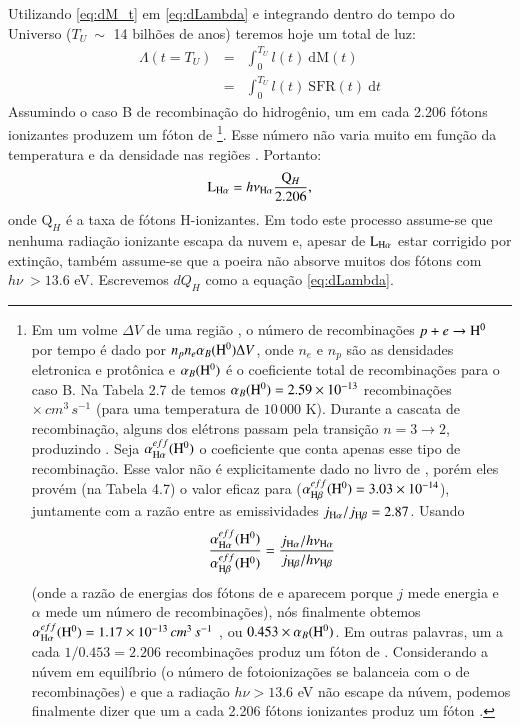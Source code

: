 Utilizando \eqref{eq:dM_t} em \eqref{eq:dLambda} e integrando dentro do tempo do Universo ($T_U\ \sim$ 14 bilhões de anos) teremos hoje um total de luz:
\begin{eqnarray}
	\Lambda(t = T_U) &=& \int_0^{T_U} l(t)\ \textrm{d}\textrm{M}(t) \\
	&=& \int_0^{T_U} l(t)\ \mathrm{SFR}(t)\  \textrm{d}t
	\label{eq:Lambda}
\end{eqnarray}
\noindent Assumindo o caso B de recombinação do hidrogênio, um em cada 2.206 fótons ionizantes produzem um fóton de \Ha \citep{Osterbrock.Ferland.2006a}\footnote{Em um volme $\Delta V$ de uma região \hii, o número de recombinações $p + e \rightarrow {\rm H}^0$ por tempo é dado por $n_p n_e \alpha_B({\rm H}^0) \Delta V$, onde $n_e$ e $n_p$ são as densidades eletronica e protônica e $\alpha_B({\rm H}^0)$ é o coeficiente total de recombinações para o caso B. Na Tabela 2.7 de \citet{Osterbrock.Ferland.2006a} temos $\alpha_B({\rm H}^0) = 2.59\times10^{-13}$ recombinações $\times\,cm^3\,s^{-1}$ (para uma temperatura de $10\,000$ K). Durante a cascata de recombinação, alguns dos elétrons passam pela transição $n = 3 \rightarrow 2$, produzindo \Ha. Seja $\alpha_{\Ha}^{eff}({\rm H}^0)$ o coeficiente que conta apenas esse tipo de recombinação. Esse valor não é explicitamente dado no livro de \citet{Osterbrock.Ferland.2006a}, porém eles provém (na Tabela 4.7) o valor eficaz para \Hb ($\alpha_{\Hb}^{eff}({\rm H}^0) = 3.03\times10^{-14}$), juntamente com a razão entre as emissividades $j_{\Ha}/j_{\Hb} = 2.87$. Usando
$$
\frac{ \alpha_{\Ha}^{eff}({\rm H}^0) }{ \alpha_{\Hb}^{eff}({\rm H}^0) } = \frac{ j_{\Ha} / h\nu_{\Ha} }{ j_{\Hb} / h\nu_{\Hb} }
$$
\noindent (onde a razão de energias dos fótons de \Ha e \Hb aparecem porque $j$ mede energia e $\alpha$ mede um número de recombinações), nós finalmente obtemos $\alpha_{\Ha}^{eff}({\rm H}^0) = 1.17\times10^{-13} \, cm^{3}\,s^{-1}$ , ou $0.453 \times \alpha_B({\rm H}^0)$. Em outras palavras, um a cada $1/0.453 = 2.206$ recombinações produz um fóton de \Ha. Considerando a núvem em equilíbrio (o número de fotoionizações se balanceia com o de recombinações) e que a radiação $h\nu > 13.6$ eV não escape da núvem, podemos finalmente dizer que um a cada 2.206 fótons ionizantes produz um fóton \Ha.}. Esse número não varia muito em função da temperatura e da densidade nas regiões \Hii. Portanto:
\begin{equation}
	\LHalpha = h \nu_{\Ha} \frac{\mathrm{Q}_H}{2.206},
	\label{eq:LHa_recomb_theory}
\end{equation}
\noindent onde $\mathrm{Q}_H$ é a taxa de fótons H-ionizantes. Em todo este processo assume-se que nenhuma radiação ionizante escapa da nuvem e, apesar de $\LHalpha$ estar corrigido por extinção, também assume-se que a poeira não absorve muitos dos fótons com $h\nu\ > 13.6$ eV. Escrevemos $dQ_H$ como a equação \eqref{eq:dLambda}.
